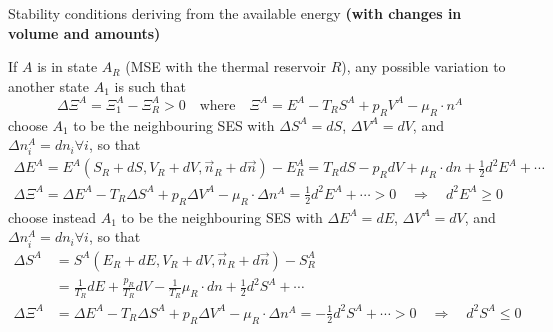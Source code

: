 \begin{thm}
    Stability conditions deriving from the available energy \textbf{(with changes in \textcolor{b1}{volume} and amounts)}

    If \( A \) is in state \( A_R \) (MSE with the thermal reservoir \( R \)), any possible variation to another state \( A_1 \) is such that  
    \[
    \Delta \Xi^A = \Xi_1^A - \Xi_R^A > 0 \quad \text{where} \quad \Xi^A = E^A - T_R S^A + p_R V^A - \mu_R \cdot n^A
    \]  
    choose \( A_1 \) to be the neighbouring SES with \(\Delta S^A = dS\), \(\Delta V^A = dV\), and \(\Delta n_i^A = dn_i \forall i\), so that  
    \begin{gather*}
    \Delta E^A = E^A (S_R + dS, V_R + dV, \vec{n}_R + d\vec{n}) - E_R^A = T_R dS - p_R dV + \mu_R \cdot dn + \frac{1}{2} d^2 E^A + \cdots
    \\
    \Delta \Xi^A = \Delta E^A - T_R \Delta S^A + p_R \Delta V^A - \mu_R \cdot \Delta n^A = \frac{1}{2} d^2 E^A + \cdots > 0 \quad \Rightarrow \quad d^2 E^A \geq 0
    \end{gather*}
    choose instead \( A_1 \) to be the neighbouring SES with \(\Delta E^A = dE\), \(\Delta V^A = dV\), and \(\Delta n_i^A = dn_i \forall i\), so that  
\begin{align*}
        \Delta S^A &= S^A (E_R + dE, V_R + dV, \vec{n}_R + d\vec{n}) - S_R^A 
        \\
        &= \frac{1}{T_R} dE + \frac{p_R}{T_R} dV - \frac{1}{T_R} \mu_R \cdot dn + \frac{1}{2} d^2 S^A + \cdots
        \\
        \Delta \Xi^A &= \Delta E^A - T_R \Delta S^A + p_R \Delta V^A - \mu_R \cdot \Delta n^A = -\frac{1}{2} d^2 S^A + \cdots > 0 \quad \Rightarrow \quad d^2 S^A \leq 0
\end{align*}
\end{thm}
